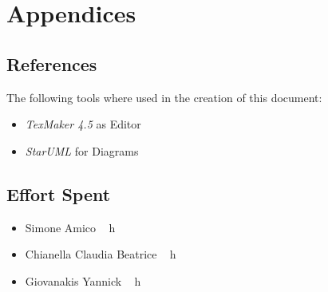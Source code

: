 \documentclass[12pt]{article}
\begin{document}
	\section{Appendices}
		\subsection{References}
		The following tools where used in the creation of this document:
		\begin{itemize}
		\item \emph{TexMaker 4.5} as Editor
		\item \emph{StarUML} for Diagrams 
		\end{itemize}
		
		
		\subsection{Effort Spent}
		\begin{itemize}
		\item Simone Amico ~  h
		\item Chianella Claudia Beatrice ~  h
		\item Giovanakis Yannick ~  h
		\end{itemize}

	 
	
\end{document}
